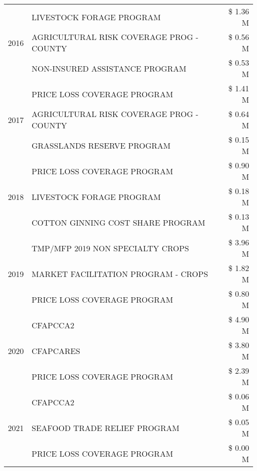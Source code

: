 \begin{tabular}{llr}
\cline{1-3}
\multirow[t]{3}{*}{2016} & LIVESTOCK FORAGE PROGRAM & \$ 1.36 M \\
 & AGRICULTURAL RISK COVERAGE PROG - COUNTY & \$ 0.56 M \\
 & NON-INSURED ASSISTANCE PROGRAM & \$ 0.53 M \\
\cline{1-3}
\multirow[t]{3}{*}{2017} & PRICE LOSS COVERAGE PROGRAM & \$ 1.41 M \\
 & AGRICULTURAL RISK COVERAGE PROG - COUNTY & \$ 0.64 M \\
 & GRASSLANDS RESERVE PROGRAM & \$ 0.15 M \\
\cline{1-3}
\multirow[t]{3}{*}{2018} & PRICE LOSS COVERAGE PROGRAM & \$ 0.90 M \\
 & LIVESTOCK FORAGE PROGRAM & \$ 0.18 M \\
 & COTTON GINNING COST SHARE PROGRAM & \$ 0.13 M \\
\cline{1-3}
\multirow[t]{3}{*}{2019} & TMP/MFP 2019 NON SPECIALTY CROPS & \$ 3.96 M \\
 & MARKET FACILITATION PROGRAM - CROPS & \$ 1.82 M \\
 & PRICE LOSS COVERAGE PROGRAM & \$ 0.80 M \\
\cline{1-3}
\multirow[t]{3}{*}{2020} & CFAPCCA2 & \$ 4.90 M \\
 & CFAPCARES & \$ 3.80 M \\
 & PRICE LOSS COVERAGE PROGRAM & \$ 2.39 M \\
\cline{1-3}
\multirow[t]{3}{*}{2021} & CFAPCCA2 & \$ 0.06 M \\
 & SEAFOOD TRADE RELIEF PROGRAM & \$ 0.05 M \\
 & PRICE LOSS COVERAGE PROGRAM & \$ 0.00 M \\
\cline{1-3}
\bottomrule
\end{tabular}
